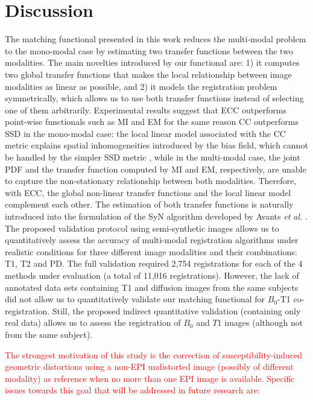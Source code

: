 \section{Discussion}
The matching functional presented in this work reduces the multi-modal problem to the mono-modal case by estimating two transfer functions between the two modalities. The main novelties introduced by our functional are: 1) it computes two global transfer functions that makes the local relationship between image modalities as linear as possible, and 2) it models the registration problem symmetrically, which allows us to use both transfer functions instead of selecting one of them arbitrarily. Experimental results suggest that ECC outperforms point-wise functionals such as MI and EM for the same reason CC outperforms SSD in the mono-modal case: the local linear model associated with the CC metric explains spatial inhomogeneities introduced by the bias field, which cannot be handled by the simpler SSD metric \cite{Wang2014}, while in the multi-modal case, the joint PDF and the transfer function computed by MI and EM, respectively, are unable to capture the non-stationary relationship between both modalities. Therefore, with ECC, the global non-linear transfer functions and the local linear model complement each other. The estimation of both transfer functions is naturally introduced into the formulation of the SyN algorithm developed by Avants {\it et al.} \cite{Avants2008, Avants2011}. The proposed validation protocol using semi-synthetic images \cite{Ocegueda2015} allows us to quantitatively assess the accuracy of multi-modal registration algorithms under realistic conditions for three different image modalities and their combinations: T1, T2 and PD. The full validation required 2,754 registrations for each of the 4 methods under evaluation (a total of 11,016 registrations). However, the lack of annotated data sets containing T1 and diffusion images from the same subjects did not allow us to quantitatively validate our matching functional for $B_{0}$-T1 co-registration. Still, the proposed indirect quantitative validation (containing only real data) allows us to assess the registration of $B_{0}$ and $T1$ images (although not from the same subject). \textcolor{red}{The strongest motivation of this study is  the correction of susceptibility-induced geometric distortions using a non-EPI undistorted image (possibly of different modality) as reference when no more than one EPI image is available. Specific issues towards this goal that will be addressed in future research are:
\begin{itemize}

\end{itemize}}
